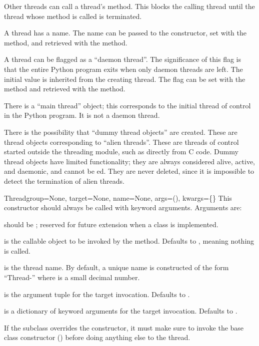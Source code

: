 Other threads can call a thread's  method.  This blocks
the calling thread until the thread whose  method is
called is terminated.

A thread has a name.  The name can be passed to the constructor,
set with the  method, and retrieved with the
 method.

A thread can be flagged as a ``daemon thread''.  The significance
of this flag is that the entire Python program exits when only
daemon threads are left.  The initial value is inherited from the
creating thread.  The flag can be set with the 
method and retrieved with the  method.

There is a ``main thread'' object; this corresponds to the
initial thread of control in the Python program.  It is not a
daemon thread.

There is the possibility that ``dummy thread objects'' are
created.  These are thread objects corresponding to ``alien
threads''.  These are threads of control started outside the
threading module, such as directly from C code.  Dummy thread objects
have limited functionality; they are always considered alive,
active, and daemonic, and cannot be ed.  They are never 
deleted, since it is impossible to detect the termination of alien
threads.


\begin{classdesc}{Thread}{group=None, target=None, name=None,
                          args=(), kwargs=\{\}}
This constructor should always be called with keyword
arguments.  Arguments are:

 should be ; reserved for future extension when
a  class is implemented.

 is the callable object to be invoked by the
 method.  Defaults to , meaning nothing is
called.

 is the thread name.  By default, a unique name is
constructed of the form ``Thread-'' where  is a small
decimal number.

 is the argument tuple for the target invocation.  Defaults
to \code{()}.

 is a dictionary of keyword arguments for the target
invocation.  Defaults to \code{\{\}}.

If the subclass overrides the constructor, it must make sure
to invoke the base class constructor ()
before doing anything else to the thread.
\end{classdesc}

